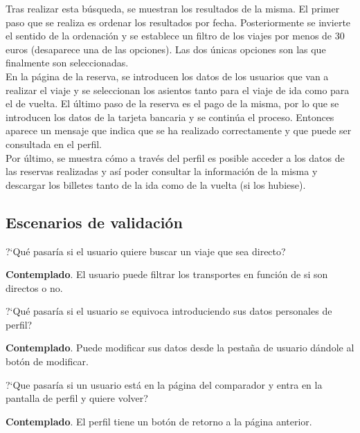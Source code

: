 Tras realizar esta búsqueda, se muestran los resultados de la misma. El primer paso que se realiza es ordenar los resultados por fecha. Posteriormente se invierte el sentido
de la ordenación y se establece un filtro de los viajes por menos de 30 euros (desaparece una de las opciones). Las dos únicas opciones son las que finalmente son seleccionadas. \\

En la página de la reserva, se introducen los datos de los usuarios que van a realizar el viaje y se seleccionan los asientos tanto para el viaje de ida como para el de
vuelta. El último paso de la reserva es el pago de la misma, por lo que se introducen los datos de la tarjeta bancaria y se continúa el proceso. Entonces aparece un mensaje
que indica que se ha realizado correctamente y que puede ser consultada en el perfil. \\

Por último, se muestra cómo a través del perfil es posible acceder a los datos de las reservas realizadas y así poder consultar la información de la misma y descargar los
billetes tanto de la ida como de la vuelta (si los hubiese).

\subsection{Escenarios de validación}
\begin{escenario} %
    \centering
    ?`Qué pasaría si el usuario quiere buscar un viaje que sea directo?
    \begin{solucion} \centering
          \textbf{Contemplado}. El usuario puede filtrar los transportes en función de si son directos o no.
    \end{solucion}
\end{escenario}

\begin{escenario} %
    \centering
    ?`Qué pasaría si el usuario se equivoca introduciendo sus datos personales de perfil?

    \begin{solucion} \centering
          \textbf{Contemplado}. Puede modificar sus datos desde la pestaña de usuario dándole al botón de modificar.
    \end{solucion}
\end{escenario}

\begin{escenario} %
    \centering
    ?`Que pasaría si un usuario está en la página del comparador y entra en la pantalla de perfil y quiere volver?

    \begin{solucion} \centering
          \textbf{Contemplado}. El perfil tiene un botón de retorno a la página anterior.
    \end{solucion}
\end{escenario}

